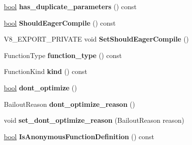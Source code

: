 \begin{DoxyCompactItemize}
\mbox{\hyperlink{classbool}{bool}} {\bfseries has\+\_\+duplicate\+\_\+parameters} () const
\item 
\mbox{\label{classv8_1_1internal_1_1FunctionLiteral_ae995baeca19a6af45d2b1d1913fc21f4}} 
\mbox{\hyperlink{classbool}{bool}} {\bfseries Should\+Eager\+Compile} () const
\item 
\mbox{\label{classv8_1_1internal_1_1FunctionLiteral_a2c835b9c9c0c6de12b3087de0d68c1f1}} 
V8\+\_\+\+E\+X\+P\+O\+R\+T\+\_\+\+P\+R\+I\+V\+A\+TE void {\bfseries Set\+Should\+Eager\+Compile} ()
\item 
\mbox{\label{classv8_1_1internal_1_1FunctionLiteral_a6b344fece650475ae4f3b49ec6b235bb}} 
Function\+Type {\bfseries function\+\_\+type} () const
\item 
\mbox{\label{classv8_1_1internal_1_1FunctionLiteral_a1521eee3afff7f8789645b14afc0c3a6}} 
Function\+Kind {\bfseries kind} () const
\item 
\mbox{\label{classv8_1_1internal_1_1FunctionLiteral_ae5bb4631781f580279c78646257df90b}} 
\mbox{\hyperlink{classbool}{bool}} {\bfseries dont\+\_\+optimize} ()
\item 
\mbox{\label{classv8_1_1internal_1_1FunctionLiteral_afc61ad6fe5de1249ba8e92c76592fd5a}} 
Bailout\+Reason {\bfseries dont\+\_\+optimize\+\_\+reason} ()
\item 
\mbox{\label{classv8_1_1internal_1_1FunctionLiteral_a9eafb67cba8eb6da7e118e1890d0c2a5}} 
void {\bfseries set\+\_\+dont\+\_\+optimize\+\_\+reason} (Bailout\+Reason reason)
\item 
\mbox{\label{classv8_1_1internal_1_1FunctionLiteral_a2726300df016e9a516e0a5a7567bd707}} 
\mbox{\hyperlink{classbool}{bool}} {\bfseries Is\+Anonymous\+Function\+Definition} () const
\item 
\mbox{\label{classv8_1_1internal_1_1FunctionLiteral_a8666facc578704c3358e39292fd12e7e}} 

\end{DoxyCompactItemize}
